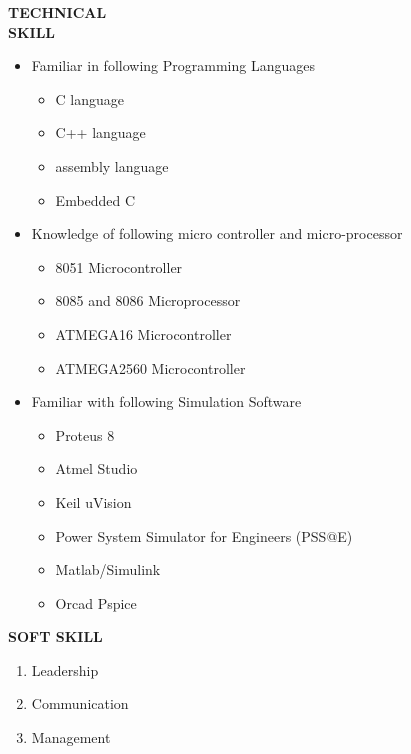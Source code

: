 \documentclass{article}
\begin{document}
	   \begin{flushleft}
	   	\vspace{1.15in}
	   	\textbf{TECHNICAL  \\ SKILL}
	   	\begin{itemize}
	   		\vspace{-0.45in}
	   		\addtolength{\itemindent}{1.359in}
	   		\item  Familiar in following Programming Languages 
	   		{\begin{itemize}
	   				\addtolength{\itemindent}{1.359in}
	   				\item C language
	   				\item C++ language
	   				\item assembly language
	   				\item Embedded C 	
	   			\end{itemize}
	   		}  
	   		\item Knowledge of following micro controller and micro-processor
	   		{\begin{itemize}
	   				\addtolength{\itemindent}{1.359in}
	   				\item 8051 Microcontroller 
	   				\item 8085 and 8086 Microprocessor
	   				\item ATMEGA16 Microcontroller
	   				\item ATMEGA2560 Microcontroller	
	   			\end{itemize}
	   		}  
	   		
	   		\item Familiar with following Simulation Software
	   		{\begin{itemize}
	   				\addtolength{\itemindent}{1.359in}
	   				\item Proteus 8 
	   				\item Atmel Studio
	   				\item Keil uVision
	   				\item Power System Simulator for Engineers (PSS@E)
	   				\item Matlab/Simulink 
	   				\item Orcad Pspice 	
	   			\end{itemize}
	   		} 
	   	\end{itemize}
	   \end{flushleft}
	   
	     	 	\begin{flushleft} 
	     	 		
	     	 		\vspace{0.4in}
	     	 		\textbf{SOFT SKILL}
	     	 		\begin{enumerate}
	     	 			\vspace{-0.30in}
	     	 			\addtolength{\itemindent}{1.359in}
	     	 			\item Leadership
	     	 			\item Communication  
	     	 			\item Management 
	     	 		\end{enumerate}
	     	 	\end{flushleft}
	     	 	
\end{document}
